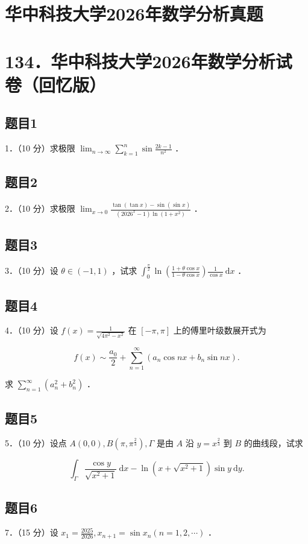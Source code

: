 \documentclass{article}
\begin{document}
\section*{华中科技大学2026年数学分析真题}
\section*{134．华中科技大学2026年数学分析试卷（回忆版）}

\subsection{题目1}
1．（10 分）求极限 \(\lim _{n \rightarrow \infty} \sum_{k=1}^{n} \sin \frac{2 k-1}{n^{2}}\) ．

\subsection{题目2}
2．（10 分）求极限 \(\lim _{x \rightarrow 0} \frac{\tan (\tan x)-\sin (\sin x)}{\left(2026^{x}-1\right) \ln \left(1+x^{2}\right)}\) ．

\subsection{题目3}
3．（10 分）设 \(\theta \in(-1,1)\) ，试求 \(\int_{0}^{\frac{\pi}{2}} \ln \left(\frac{1+\theta \cos x}{1-\theta \cos x}\right) \frac{1}{\cos x} \mathrm{~d} x\) ．

\subsection{题目4}
4．（10 分）设 \(f(x)=\frac{1}{\sqrt{4 \pi^{2}-x^{2}}}\) 在 \([-\pi, \pi]\) 上的傅里叶级数展开式为

\[
f(x) \sim \frac{a_{0}}{2}+\sum_{n=1}^{\infty}\left(a_{n} \cos n x+b_{n} \sin n x\right) .
\]

求 \(\sum_{n=1}^{\infty}\left(a_{n}^{2}+b_{n}^{2}\right)\) ．

\subsection{题目5}
5．（10 分）设点 \(A(0,0), B\left(\pi, \pi^{\frac{2}{3}}\right), \Gamma\) 是由 \(A\) 沿 \(y=x^{\frac{2}{3}}\) 到 \(B\) 的曲线段，试求

\[
\int_{\Gamma} \frac{\cos y}{\sqrt{x^{2}+1}} \mathrm{~d} x-\ln \left(x+\sqrt{x^{2}+1}\right) \sin y \mathrm{~d} y .
\]

\subsection{题目6}
7．（15 分）设 \(x_{1}=\frac{2025}{2026}, x_{n+1}=\sin x_{n}(n=1,2, \cdots)\) ．
\end{document}
